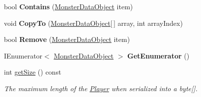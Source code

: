 \begin{DoxyCompactItemize}
\item 
\hypertarget{class_game_state_1_1_player_ac862c1353bfbc38d53e2301548ded23a}{bool {\bfseries Contains} (\hyperlink{class_monster_data_object}{Monster\-Data\-Object} item)}\label{class_game_state_1_1_player_ac862c1353bfbc38d53e2301548ded23a}

\item 
\hypertarget{class_game_state_1_1_player_a5c3546baf67a5d27553c814df4def68a}{void {\bfseries Copy\-To} (\hyperlink{class_monster_data_object}{Monster\-Data\-Object}\mbox{[}$\,$\mbox{]} array, int array\-Index)}\label{class_game_state_1_1_player_a5c3546baf67a5d27553c814df4def68a}

\item 
\hypertarget{class_game_state_1_1_player_a98c86c2ffe06038710acb4951479dff9}{bool {\bfseries Remove} (\hyperlink{class_monster_data_object}{Monster\-Data\-Object} item)}\label{class_game_state_1_1_player_a98c86c2ffe06038710acb4951479dff9}

\item 
\hypertarget{class_game_state_1_1_player_a02e1f98267c1fcf0258528ad72bd5d25}{I\-Enumerator$<$ \hyperlink{class_monster_data_object}{Monster\-Data\-Object} $>$ {\bfseries Get\-Enumerator} ()}\label{class_game_state_1_1_player_a02e1f98267c1fcf0258528ad72bd5d25}

\item 
\hypertarget{class_game_state_1_1_player_abb92c259431397bdda45f001e59addea}{int \hyperlink{class_game_state_1_1_player_abb92c259431397bdda45f001e59addea}{get\-Size} () const }\label{class_game_state_1_1_player_abb92c259431397bdda45f001e59addea}

\begin{DoxyCompactList}\small\item\em The maximum length of the \hyperlink{class_game_state_1_1_player}{Player} when serialized into a byte\mbox{[}\mbox{]}. \end{DoxyCompactList}\end{DoxyCompactItemize}
